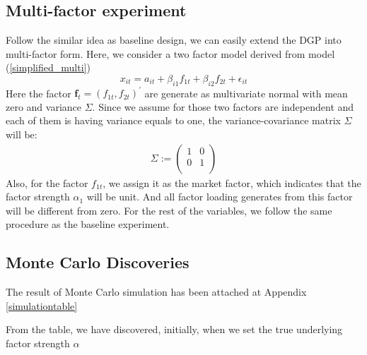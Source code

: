 \documentclass[12pt]{article}
\begin{document}
\subsection{Multi-factor experiment}
Follow the similar idea as baseline design, we can easily extend the DGP into multi-factor form. 
Here, we consider a two factor model derived from model (\ref{simplified_multi})
	\[   x_{it} = a_{it} + \beta_{i1}f_{1t} + \beta_{i2}f_{2t}+\epsilon_{it}  \tag{8}  \]
Here the factor $\mathbf{f}_t = (f_{1t}, f_{2t})^{\prime}$ are generate as multivariate normal with mean zero and variance $\Sigma$.
Since we assume for those two factors are independent and each of them is having variance equals to one, the variance-covariance matrix $\Sigma$ will be:
\begin{align*}
\Sigma := 
\begin{pmatrix}
1 &0\\
0 & 1 \\
\end{pmatrix}
\end{align*}
Also, for the factor $f_{1t}$, we assign it as the market factor, which indicates that the factor strength $\alpha_1$ will be unit.
And all factor loading generates from this factor will be different from zero.
For the rest of the variables, we follow the same procedure as the baseline experiment.


\subsection{Monte Carlo Discoveries}
The result of Monte Carlo simulation has been attached at Appendix \ref{simulationtable}

From the table, we have discovered, initially, when we set the true underlying factor strength $\alpha$ 


\newpage



\newpage
\appendix



		
\end{document}
